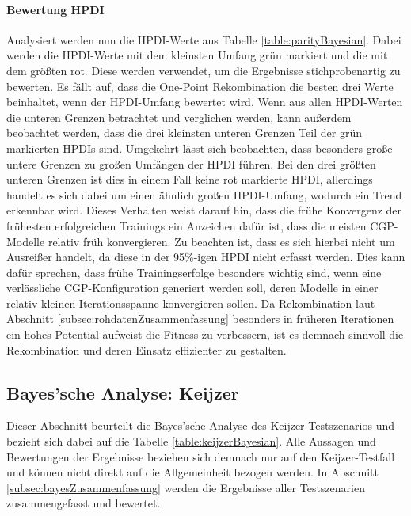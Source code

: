 \paragraph{Bewertung HPDI}
Analysiert werden nun die HPDI-Werte aus Tabelle \ref{table:parityBayesian}.
Dabei werden die HPDI-Werte mit dem kleinsten Umfang grün markiert und die mit dem größten rot.
Diese werden verwendet, um die Ergebnisse stichprobenartig zu bewerten.
Es fällt auf, dass die One-Point Rekombination die besten drei Werte beinhaltet, wenn der HPDI-Umfang bewertet wird.
Wenn aus allen HPDI-Werten die unteren Grenzen betrachtet und verglichen werden, kann außerdem beobachtet werden, dass die drei kleinsten unteren Grenzen Teil der grün markierten HPDIs sind.
Umgekehrt lässt sich beobachten, dass besonders große untere Grenzen zu großen Umfängen der HPDI führen.
Bei den drei größten unteren Grenzen ist dies in einem Fall keine rot markierte HPDI, allerdings handelt es sich dabei um einen ähnlich großen HPDI-Umfang, wodurch ein Trend erkennbar wird.
Dieses Verhalten weist darauf hin, dass die frühe Konvergenz der frühesten erfolgreichen Trainings ein Anzeichen dafür ist, dass die meisten CGP-Modelle relativ früh konvergieren.
Zu beachten ist, dass es sich hierbei nicht um Ausreißer handelt, da diese in der 95\%-igen HPDI nicht erfasst werden.
Dies kann dafür sprechen, dass frühe Trainingserfolge besonders wichtig sind, wenn eine verlässliche CGP-Konfiguration generiert werden soll, deren Modelle in einer relativ kleinen Iterationsspanne konvergieren sollen.
Da Rekombination laut Abschnitt \ref{subsec:rohdatenZusammenfassung} besonders in früheren Iterationen ein hohes Potential aufweist die Fitness zu verbessern, ist es demnach sinnvoll die Rekombination und deren Einsatz effizienter zu gestalten.

\subsection{Bayes'sche Analyse: Keijzer}
\label{subsec:bayesKeijzer}

Dieser Abschnitt beurteilt die Bayes'sche Analyse des Keijzer-Testszenarios und bezieht sich dabei auf die Tabelle \ref{table:keijzerBayesian}.
Alle Aussagen und Bewertungen der Ergebnisse beziehen sich demnach nur auf den Keijzer-Testfall und können nicht direkt auf die Allgemeinheit bezogen werden.
In Abschnitt \ref{subsec:bayesZusammenfassung} werden die Ergebnisse aller Testszenarien zusammengefasst und bewertet.
